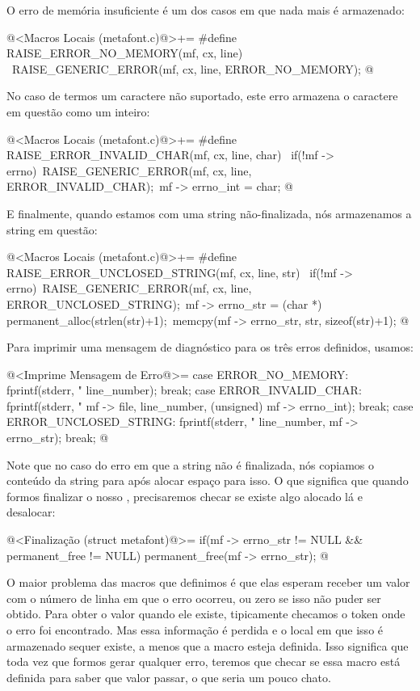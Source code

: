 O erro de memória insuficiente é um dos casos em que nada mais é
armazenado:

\iniciocodigo
@<Macros Locais (metafont.c)@>+=
#define RAISE_ERROR_NO_MEMORY(mf, cx, line) {\
  RAISE_GENERIC_ERROR(mf, cx, line, ERROR_NO_MEMORY);}
@
\fimcodigo

No caso de termos um caractere não suportado, este erro armazena o
caractere em questão como um inteiro:

\iniciocodigo
@<Macros Locais (metafont.c)@>+=
#define RAISE_ERROR_INVALID_CHAR(mf, cx, line, char) {\
  if(!mf -> errno){\
    RAISE_GENERIC_ERROR(mf, cx, line, ERROR_INVALID_CHAR);\
    mf -> errno_int = char;}}
@
\fimcodigo

E finalmente, quando estamos com uma string não-finalizada, nós
armazenamos a string em questão:

\iniciocodigo
@<Macros Locais (metafont.c)@>+=
#define RAISE_ERROR_UNCLOSED_STRING(mf, cx, line, str) {\
  if(!mf -> errno){\
    RAISE_GENERIC_ERROR(mf, cx, line, ERROR_UNCLOSED_STRING);\
    mf -> errno_str = (char *) permanent_alloc(strlen(str)+1);\
    memcpy(mf -> errno_str, str, sizeof(str)+1);}}
@
\fimcodigo

Para imprimir uma mensagem de diagnóstico para os três erros
definidos, usamos:

\iniciocodigo
@<Imprime Mensagem de Erro@>=
case ERROR_NO_MEMORY:
  fprintf(stderr, "%
          line_number);
  break;
case ERROR_INVALID_CHAR:
  fprintf(stderr, "%
          mf -> file, line_number, (unsigned) mf -> errno_int);
  break;
case ERROR_UNCLOSED_STRING:
  fprintf(stderr, "%
          line_number, mf -> errno_str);
  break;
@
\fimcodigo

Note que no caso do erro em que a string não é finalizada, nós
copiamos o conteúdo da string para  após alocar
espaço para isso. O que significa que quando formos finalizar o
nosso \monoespaco{struct metafont}, precisaremos checar se existe algo
alocado lá e desalocar:

\iniciocodigo
@<Finalização (struct metafont)@>=
if(mf -> errno_str != NULL && permanent_free != NULL)
  permanent_free(mf -> errno_str);
@
\fimcodigo

O maior problema das macros que definimos é que elas esperam receber
um valor com o número de linha em que o erro ocorreu, ou zero se isso
não puder ser obtido. Para obter o valor quando ele existe,
tipicamente checamos o token onde o erro foi encontrado. Mas essa
informação é perdida e o local em que isso é armazenado sequer existe,
a menos que a macro  esteja
definida. Isso significa que toda vez que formos gerar qualquer erro,
teremos que checar se essa macro está definida para saber que valor
passar, o que seria um pouco chato.

